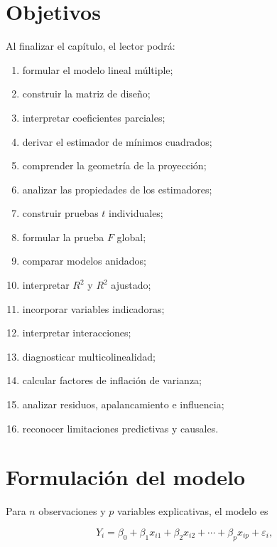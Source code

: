 \documentclass[
  spanish,
  10.5pt,
  letterpaper,
  DIV=11,
  numbers=noendperiod,
  oneside,
  open=any]{scrreprt}
\providecommand{\tightlist}{%
  \setlength{\itemsep}{0pt}\setlength{\parskip}{0pt}}
\theoremstyle{definition}
\theoremstyle{definition}
\theoremstyle{plain}
\theoremstyle{remark}
\begin{document}
\section*{Objetivos}\label{objetivos-9}


Al finalizar el capítulo, el lector podrá:

\begin{enumerate}
\def\labelenumi{\arabic{enumi}.}
\tightlist
\item
  formular el modelo lineal múltiple;
\item
  construir la matriz de diseño;
\item
  interpretar coeficientes parciales;
\item
  derivar el estimador de mínimos cuadrados;
\item
  comprender la geometría de la proyección;
\item
  analizar las propiedades de los estimadores;
\item
  construir pruebas \(t\) individuales;
\item
  formular la prueba \(F\) global;
\item
  comparar modelos anidados;
\item
  interpretar \(R^2\) y \(R^2\) ajustado;
\item
  incorporar variables indicadoras;
\item
  interpretar interacciones;
\item
  diagnosticar multicolinealidad;
\item
  calcular factores de inflación de varianza;
\item
  analizar residuos, apalancamiento e influencia;
\item
  reconocer limitaciones predictivas y causales.
\end{enumerate}

\section*{Formulación del modelo}\label{formulaciuxf3n-del-modelo-1}


Para \(n\) observaciones y \(p\) variables explicativas, el modelo es

\[
Y_i
=
\beta_0
+
\beta_1 x_{i1}
+
\beta_2 x_{i2}
+
\cdots
+
\beta_p x_{ip}
+
\varepsilon_i,
\]
\end{document}
